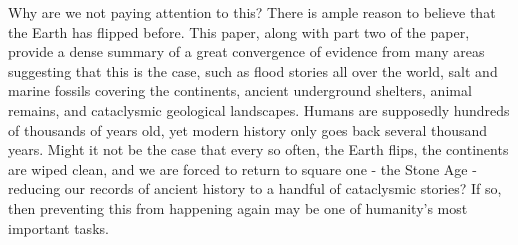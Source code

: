 \documentclass[10pt,twocolumn,letterpaper]{article}
\begin{document}
Why are we not paying attention to this? There is ample reason to believe that the Earth has flipped before. This paper, along with part two of the paper, provide a dense summary of a great convergence of evidence from many areas suggesting that this is the case, such as flood stories all over the world, salt and marine fossils covering the continents, ancient underground shelters, animal remains, and cataclysmic geological landscapes. Humans are supposedly hundreds of thousands of years old, yet modern history only goes back several thousand years. Might it not be the case that every so often, the Earth flips, the continents are wiped clean, and we are forced to return to square one - the Stone Age - reducing our records of ancient history to a handful of cataclysmic stories? If so, then preventing this from happening again may be one of humanity's most important tasks.
\end{document}
